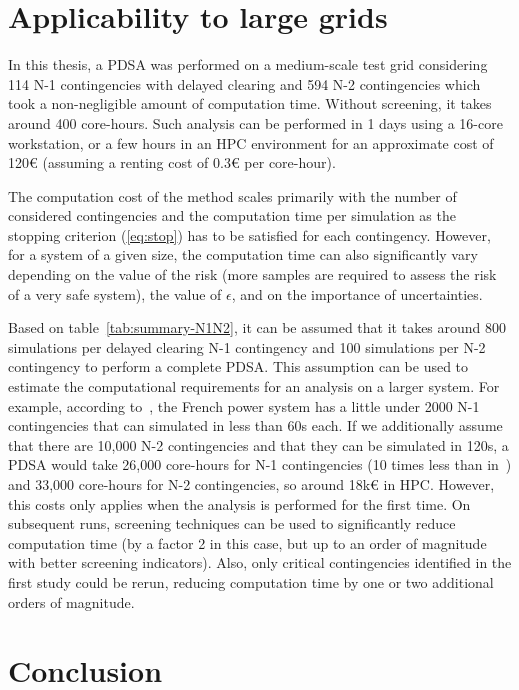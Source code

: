\section{Applicability to large grids}
\label{sec:PDSA_scalability}


In this thesis, a PDSA was performed on a medium-scale test grid considering 114 N-1 contingencies with delayed clearing and 594 N-2 contingencies which took a non-negligible amount of computation time. Without screening, it takes around 400 core-hours. Such analysis can be performed in 1 days using a 16-core workstation, or a few hours in an HPC environment for an approximate cost of 120€ (assuming a renting cost of 0.3€ per core-hour).

The computation cost of the method scales primarily with the number of considered contingencies and the computation time per simulation as the stopping criterion (\ref{eq:stop}) has to be satisfied for each contingency. However, for a system of a given size, the computation time can also significantly vary depending on the value of the risk (more samples are required to assess the risk of a very safe system), the value of \(\epsilon\), and on the importance of uncertainties.

Based on table~\ref{tab:summary-N1N2}, it can be assumed that it takes around 800 simulations per delayed clearing N-1 contingency and 100 simulations per N-2 contingency to perform a complete PDSA. This assumption can be used to estimate the computational requirements for an analysis on a larger system. For example, according to~\cite{EurostagHPC}, the French power system has a little under 2000 N-1 contingencies that can simulated in less than 60s each. If we additionally assume that there are 10,000 N-2 contingencies and that they can be simulated in 120s, a PDSA would take 26,000 core-hours for N-1 contingencies (10 times less than in~\cite{EurostagHPC}) and 33,000 core-hours for N-2 contingencies, so around 18k€ in HPC. However, this costs only applies when the analysis is performed for the first time. On subsequent runs, screening techniques can be used to significantly reduce computation time (by a factor 2 in this case, but up to an order of magnitude with better screening indicators). Also, only critical contingencies identified in the first study could be rerun, reducing computation time by one or two additional orders of magnitude.

\section{Conclusion}
\label{sec:PDSA_conclusion}


